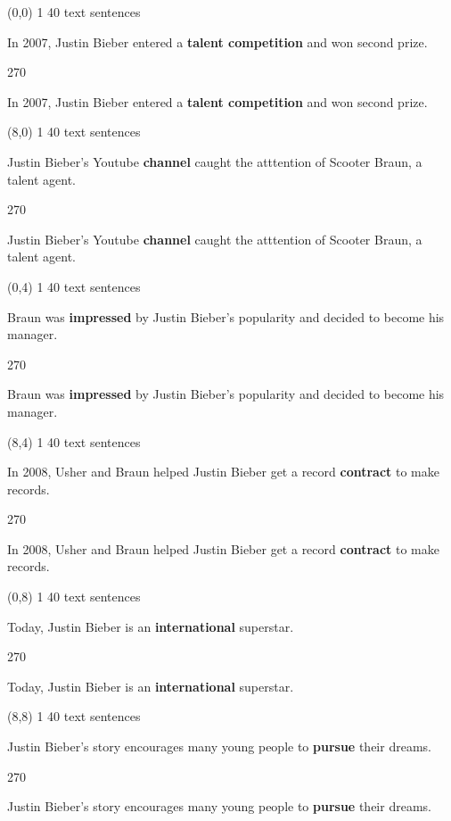 \documentclass[a4paper]{article}
\newenvironment{itemize*}%
{\begin{itemize}%
 \setlength{\itemsep}{0.5cm}%
 \setlength{\parsep}{0pt}%
 \setlength{\parskip}{0pt}}%
{\end{itemize}}
\newcommand{\mycard}[3]{%
	\small #1 #2
	\par
	\parbox[t][6.8cm][c]{9.5cm}{%
	\par
	\myleft{#3}
	\par
	\myright{#3}
	}
}
\newcommand{\myleft}[1]{%
	\begin{sideways}
	\hspace*{-0.9cm}
		\parbox[t][2.7cm][t]{6.5cm}{%
		\large #1
		}
	\end{sideways}
}
\newcommand{\myright}[1]{%
	\hspace*{6.5cm}
	\begin{turn}{270}
	\hspace*{-7.1cm}
		\parbox[t][2.7cm][t]{6.5cm}{%
		\large #1
		}
	\end{turn}
}
\begin{document}
\null
\newpage

\begin{textblock}{8}(0,0)
\mycard{1}{40 text sentences}{
\begin{itemize*}
\item In 2007, Justin Bieber entered a \textbf{talent competition} and won second prize.
\end{itemize*}
}
\end{textblock}

\begin{textblock}{8}(8,0)
\mycard{1}{40 text sentences}{
\begin{itemize*}
\item Justin Bieber's Youtube \textbf{channel} caught the atttention of Scooter Braun, a talent agent.
\end{itemize*}
}
\end{textblock}

\begin{textblock}{8}(0,4)
\mycard{1}{40 text sentences}{
\begin{itemize*}
\item Braun was \textbf{impressed} by Justin Bieber's popularity and decided to become his manager.
\end{itemize*}
}
\end{textblock}

\begin{textblock}{8}(8,4)
\mycard{1}{40 text sentences}{
\begin{itemize*}
\item In 2008, Usher and Braun helped Justin Bieber get a record \textbf{contract} to make records.
\end{itemize*}
}
\end{textblock}

\begin{textblock}{8}(0,8)
\mycard{1}{40 text sentences}{
\begin{itemize*}
\item Today, Justin Bieber is an \textbf{international} superstar.
\end{itemize*}
}
\end{textblock}

\begin{textblock}{8}(8,8)
\mycard{1}{40 text sentences}{
\begin{itemize*}
\item Justin Bieber's story encourages many young people to \textbf{pursue} their dreams.
\end{itemize*}
}
\end{textblock}
\end{document}
